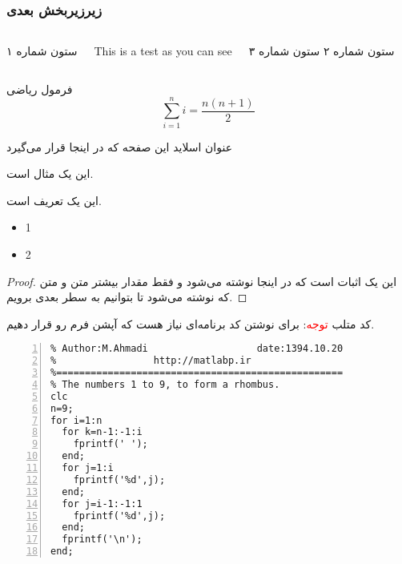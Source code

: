 \documentclass[10pt,xcolor=dvipsnames]{beamer}
\begin{document}
\subsubsection{زیرزیربخش بعدی}
\begin{frame}
\begin{columns} 
ستون شماره ۱
\begin{latin}
This is a test as you can see
\end{latin}
ستون شماره ۲
ستون شماره ۳
\end{columns}

\begin{block}{فرمول ریاضی}
\begin{equation}
\sum_{i=1}^{n} i = \frac{n(n+1)}{2}
\end{equation}
\end{block}

\end{frame}
\begin{frame}{عنوان اسلاید این صفحه  که در اینجا قرار می‌گیرد}
\begin{example}
این یک مثال است.
\end{example}


\begin{definition}
این یک تعریف است.
\begin{itemize}\raggedright
\item 1
\item 2
\end{itemize}
\end{definition}

\begin{proof}
این یک اثبات است که در اینجا نوشته می‌شود و فقط مقدار بیشتر متن و متن که نوشته می‌شود تا بتوانیم به سطر بعدی برویم.
\end{proof}

\end{frame}
\begin{frame}[fragile]{کد متلب}
\textcolor{red}{توجه}:
برای نوشتن کد برنامه‌ای نیاز هست که آپشن فرم رو 
قرار دهیم.
\begin{latin}
\begin{lstlisting}[frame=single,rulecolor=\color{magenta},numbers=left,numberstyle=\tiny]
%==================================================
% Author:M.Ahmadi                   date:1394.10.20
%                 http://matlabp.ir
%==================================================
% The numbers 1 to 9, to form a rhombus.
clc
n=9;
for i=1:n
  for k=n-1:-1:i
    fprintf(' ');
  end;
  for j=1:i
    fprintf('%d',j);
  end;
  for j=i-1:-1:1
    fprintf('%d',j);
  end;
  fprintf('\n');
end;
\end{lstlisting}
\end{latin}
\end{frame}
\end{document}
